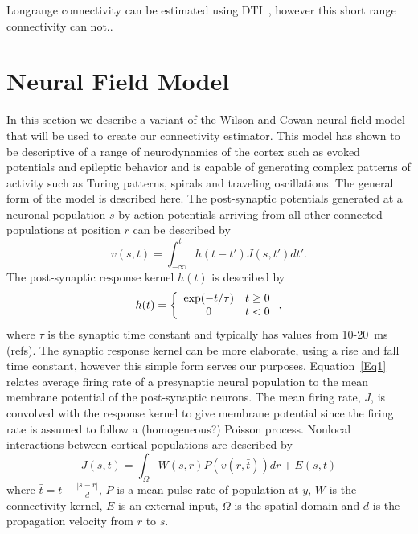 \documentclass[onecolumn,draftcls]{IEEEtran}
\begin{document}
Longrange connectivity can be estimated using DTI~\cite{Knock2009}, however this short range connectivity can not..

\section{Neural Field Model}
In this section we describe a variant of the  Wilson and Cowan neural field model~\cite{Wilson1973} that will be used to create our connectivity estimator. This model has shown to be descriptive of a range of neurodynamics of the cortex such as evoked potentials and epileptic behavior and is capable of generating complex patterns of activity such as Turing patterns, spirals and traveling oscillations. The general form of the model is described here. The post-synaptic potentials generated at a neuronal population $s$ by action potentials arriving from all other connected populations at position $r$ can be described by
\begin{equation}\label{Eq1}
v\left( {s,t} \right) = \int_{ - \infty }^t {h\left( {t - t'} \right)J\left( {s,t'} \right)dt'}.
\end{equation}
The post-synaptic response kernel $h(t)$ is described by
\begin{equation}\label{Eq2}
h(t) = \left\{ {\begin{array}{*{20}{c}}
   {\exp ( - {t \mathord{\left/
 {\vphantom {t \tau }} \right.
 \kern-\nulldelimiterspace} \tau })} & {t \ge 0}  \\
   0 & {t < 0}  \\
\end{array}} \right.,
\end{equation}
where $\tau$ is the synaptic time constant and typically has values from 10-20~ms (\textcolor[rgb]{1.00,0.00,0.00}{refs}). The synaptic response kernel can be more elaborate, using a rise and fall time constant, however this simple form serves our purposes. Equation~\ref{Eq1} relates average firing rate of a presynaptic neural population to the mean membrane potential of the post-synaptic neurons. The mean firing rate, $J$, is convolved with the response kernel to give membrane potential since the firing rate is assumed to follow a (homogeneous?) Poisson process. Nonlocal interactions between cortical populations are described by	
\begin{equation}\label{Eq3}
J\left( {s,t} \right) = \int_\Omega  {W\left( {s,r} \right)P\left( {v\left( {r,\bar t} \right)} \right)dr}  + E\left( {s,t} \right)
\end{equation}
where $\bar t = t - \frac{{\left| {s - r} \right|}}{d}$, $P$ is a mean pulse rate of population at $y$, $W$ is the connectivity kernel, $E$ is an external input, $\Omega$ is the spatial domain and $d$ is the propagation velocity from $r$ to $s$.
\end{document}
